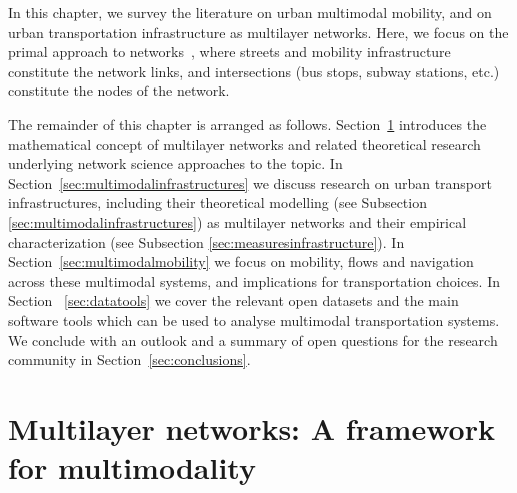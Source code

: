 
In this chapter, we survey the literature on urban multimodal mobility, and on urban transportation infrastructure as multilayer networks. Here, we focus on the primal approach to networks~\cite{porta2006primal}, where streets and mobility infrastructure constitute the network links, and intersections (bus stops, subway stations, etc.) constitute the nodes of the network.

The remainder of this chapter is arranged as follows. Section~\ref{sec:multilayernetworks} introduces the mathematical concept of multilayer networks and related theoretical research underlying network science approaches to the topic. In Section~\ref{sec:multimodalinfrastructures} we discuss research on urban transport infrastructures, including their theoretical modelling (see Subsection \ref{sec:multimodalinfrastructures}) as multilayer networks and their empirical characterization (see Subsection \ref{sec:measuresinfrastructure}). In Section~\ref{sec:multimodalmobility} we focus on mobility, flows and navigation across these multimodal systems, and implications for transportation choices. In Section ~\ref{sec:datatools} we cover the relevant open datasets and the main software tools which can be used to analyse multimodal transportation systems. We conclude with an outlook and a summary of open questions for the research community in Section~\ref{sec:conclusions}. 

\section{Multilayer networks: A framework for multimodality}\label{sec:multilayernetworks}

